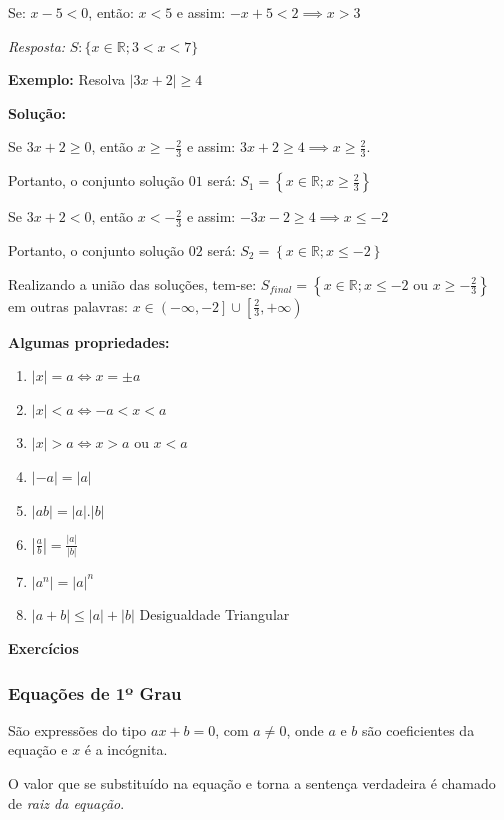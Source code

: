 \documentclass[oneside,a4paper,12pt]{article}
\begin{document}
Se: $x - 5 < 0$, então: $x < 5$ e assim: $-x +5 < 2 \implies x > 3$

{\it Resposta:} $S:\{x \in \mathbb{R};3 < x < 7\}$

\textbf{Exemplo:} Resolva $|3x + 2| \geq 4$

{\bf Solução:}

Se $3x + 2 \geq 0$, então $x \geq \displaystyle -\frac{2}{3}$ e assim: $3x + 2 \geq 4 \implies x \geq \displaystyle \frac{2}{3}$. 

Portanto, o conjunto solução $01$ será: $S_1 = \left\{ x \in \mathbb{R}; x \geq \displaystyle \frac{2}{3} \right\}$

Se $3x + 2 < 0$, então $x < \displaystyle - \frac{2}{3}$ e assim: $-3x - 2 \geq 4 \implies x \leq -2$

Portanto, o conjunto solução $02$ será: $S_2 = \left\{ x \in \mathbb{R}; x \leq -2 \right\}$

Realizando a união das soluções, tem-se: $S_{final} = \left\{ x \in \mathbb{R}; x \leq -2 \text{ ou } x \geq \displaystyle - \frac{2}{3} \right\}$ em outras palavras: $x \in \left( -\infty,-2 \right] \displaystyle \cup \left[\frac{2}{3},+ \infty \right)$

{\bf Algumas propriedades:}
\begin{enumerate}
	\item $|x| = a \Leftrightarrow x = \pm a$
	\item $|x| < a \Leftrightarrow -a < x < a$
	\item $|x| > a \Leftrightarrow x>a$ ou $x<a$
	\item $|-a| = |a|$
	\item $|ab|=|a|.|b|$
	\item $|\frac{a}{b}| = \frac{|a|}{|b|}$
	\item $|a^{n}| = |a|^{n}$
	\item $|a+b| \leq |a| + |b|$ Desigualdade Triangular
\end{enumerate}

\textbf{Exercícios}

\subsubsection{Equações de 1º Grau}

São expressões do tipo $ax+b=0$, com $a \neq 0$, onde $a$ e $b$ são coeficientes da equação e $x$ é a incógnita.

O valor que se substituído na equação e torna a sentença verdadeira é chamado de {\it raiz da equação}.
\end{document}
